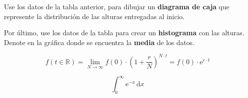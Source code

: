 \documentclass{caes}
\begin{document}
\newpage

\pregunta{} Use los datos de la tabla anterior, para dibujar un {\bfseries diagrama 
de caja} que represente la distribución de las alturas entregadas al inicio.
\desarrollo[8cm]

\pregunta{} Por último, use los datos de la tabla para crear un 
{\bfseries histograma} con las alturas. Denote en la gráfica donde 
se encuentra la {\bfseries media} de los datos.
\desarrollo[11cm]

\begin{equation}
    f(t \in {\mathbb R}) = \lim_{N\to\infty} f(0) \cdot \left(1 + \dfrac{r}{N} \right)^{N \cdot t} = f(0)\cdot {\mathrm e}^{r \cdot t}
\end{equation}

\begin{equation}
    \int_0^\infty \mathrm{e}^{-x}\,\mathrm{d}x
\end{equation}
\end{document}
